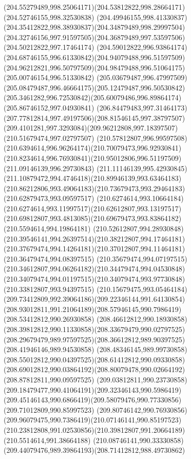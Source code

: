 {{\curveto(204.55279489,998.25064171)(204.53812822,998.28664171)(204.52746155,998.32530838)
\curveto(204.49946155,998.41330837)(204.35412822,998.38930837)(204.34879489,998.29997504)
\curveto(204.32746156,997.91597505)(204.36879489,997.53597506)(204.50212822,997.17464174)
\curveto(204.59012822,996.93864174)(204.68746155,996.61330842)(204.94079488,996.51597509)
\curveto(204.96212821,996.50797509)(204.98479488,996.51064175)(205.00746154,996.51330842)
\curveto(205.03679487,996.47997509)(205.08479487,996.46664175)(205.12479487,996.50530842)
\curveto(205.3461282,996.72530842)(205.60079486,996.89864174)(205.86746152,997.04930841)
\curveto(206.84479483,997.31464173)(207.77812814,997.49197506)(208.81546145,997.38797507)
\curveto(209.4101281,997.3293084)(209.96212808,997.18397507)(210.51679474,997.02797507)
\curveto(210.57812807,996.99597508)(210.6394614,996.96264174)(210.70079473,996.92930841)
\curveto(210.8234614,996.76930841)(210.95012806,996.51197509)(211.09146139,996.29730843)
\curveto(211.11146139,995.42930845)(211.10879472,994.4746418)(210.89946139,993.63464183)
\curveto(210.86212806,993.49064183)(210.73679473,993.29464183)(210.62879473,993.09597517)
\curveto(210.6274614,993.10664184)(210.6274614,993.11997517)(210.62612807,993.13197517)
\curveto(210.69812807,993.4813085)(210.69679473,993.83864182)(210.5594614,994.19864181)
\curveto(210.52612807,994.28930848)(210.39546141,994.26397514)(210.38212807,994.17464181)
\curveto(210.37679474,994.14264181)(210.37012807,994.11464181)(210.36479474,994.08397515)
\curveto(210.35679474,994.07197515)(210.34612807,994.06264182)(210.34479474,994.04530848)
\curveto(210.34079474,994.01197515)(210.34079474,993.97730848)(210.33812807,993.94397515)
\curveto(210.15679475,993.05464184)(209.73412809,992.39064186)(209.22346144,991.64130854)
\curveto(208.93012811,991.21064189)(208.57946145,990.7986419)(208.53412812,990.26930858)
\curveto(208.46612812,990.18930858)(208.39812812,990.11330858)(208.33679479,990.02797525)
\curveto(208.29679479,989.97597525)(208.36612812,989.90397525)(208.41946146,989.94530858)
\curveto(208.48346145,989.99730858)(208.55012812,990.04397525)(208.61412812,990.09330858)
\curveto(208.69012812,990.03864192)(208.80079478,990.02664192)(208.87812811,990.09597525)
\curveto(209.03812811,990.23730858)(209.18479477,990.41064191)(209.32346143,990.5986419)
\curveto(209.45146143,990.6866419)(209.58079476,990.77330856)(209.71012809,990.85997523)
\curveto(209.80746142,990.76930856)(209.96079475,990.7386419)(210.07146141,990.85197523)
\curveto(210.23812808,991.02530856)(210.39812807,991.20664189)(210.5514614,991.38664188)
\curveto(210.08746141,990.33330858)(209.44079476,989.39864193)(208.71412812,988.49730862)
}}
